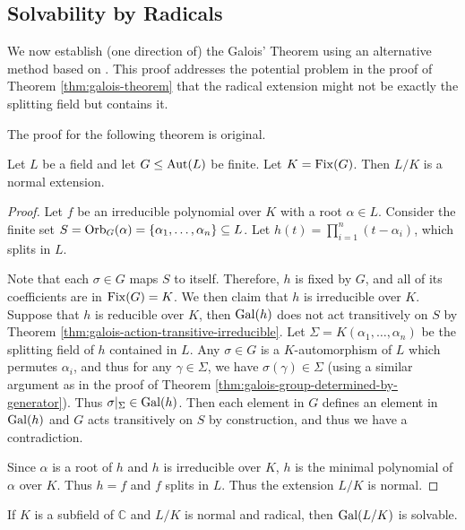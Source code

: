 \subsection{Solvability by Radicals} \label{sec:radical-alter}

We now establish (one direction of) the Galois' Theorem using an alternative method based on \cite[Chapter~15]{Stewart}. This proof addresses the potential problem in the proof of Theorem \ref{thm:galois-theorem} that the radical extension might not be exactly the splitting field but contains it.  

The proof for the following theorem is original. 
\begin{theorem} \label{thm:fix-extension-normal}
	Let $L$ be a field and let $G \le \operatorname{Aut}(L)$ be finite. Let $K = \operatorname{Fix}(G)$. Then $L/K$ is a normal extension.
\end{theorem}

\begin{proof}
	
	Let $f$ be an irreducible polynomial over $K$ with a root $\alpha \in L$. Consider the finite set $S = \operatorname{Orb}_G(\alpha) = \{ \alpha_1, \ldots, \alpha_n\} \subseteq L$. Let $h(t) = \prod_{i = 1} ^n (t - \alpha_i)$, which splits in $L$.
	
	Note that each $\sigma \in G$ maps $S$ to itself. Therefore, $h$ is fixed by $G$, and all of its coefficients are in $\operatorname{Fix}(G) = K$. We then claim that $h$ is irreducible over $K$. Suppose that $h$ is reducible over $K$, then $\operatorname{Gal}(h)$ does not act transitively on $S$ by Theorem \ref{thm:galois-action-transitive-irreducible}. Let $\Sigma = K(\alpha_1, \dots, \alpha_n)$ be the splitting field of $h$ contained in $L$.  Any $\sigma \in G$ is a $K$-automorphism of $L$ which permutes $\alpha_i$, and thus for any $\gamma \in \Sigma$, we have $\sigma(\gamma) \in \Sigma$ (using a similar argument as in the proof of Theorem \ref{thm:galois-group-determined-by-generator}). Thus $\sigma | _ \Sigma \in \operatorname{Gal}(h)$. 
	Then each element in $G$ defines an element in $\operatorname{Gal}(h)$ and $G$ acts transitively on $S$ by construction, and thus we have a contradiction. 
	
	Since $\alpha$ is a root of $h$ and $h$ is irreducible over $K$, $h$ is the minimal polynomial of $\alpha$ over $K$. Thus $h = f$ and $f$ splits in $L$. Thus the extension $L/K$ is normal. 
\end{proof}


\begin{theorem} \label{thm:radical-3}
	If $K$ is a subfield of $\mathbb{C}$ and $L / K$ is normal and radical, then $\operatorname{Gal}(L / K)$ is solvable.
\end{theorem}

